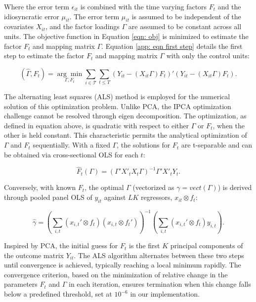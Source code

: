\documentclass[12pt]{article}
\begin{document}
\noindent Where the error term $\epsilon_{it}$ is combined with the time varying factors $F_t$ and the idiosyncratic error $\mu_{it}$. The error term $\mu_{it}$ is assumed to be independent of the covariates $X_{it}$, and the factor loadings $\Gamma$ are assumed to be constant across all units. The objective function in Equation \ref{eqn: obj} is minimized to estimate the factor $F_t$ and mapping matrix $\Gamma$. Equation \ref{app: eqn first step} details the first step to estimate the factor $F_t$ and mapping matrix $\Gamma$ with only the control units:

\begin{equation}
\label{app: eqn first step}
(\hat{\Gamma}, \hat{F}_t) = \underset{\Gamma, F_t}{\arg\min} \sum_{i \in \mathcal{T}} \sum_{t \leq T} \left( Y_{it} - (X_{it}\Gamma) F_{t} \right)' \left( Y_{it} - (X_{it}\Gamma) F_{t} \right).
\end{equation}

The alternating least squares (ALS) method is employed for the numerical solution of this optimization problem. Unlike PCA, the IPCA optimization challenge cannot be resolved through eigen decomposition. The optimization, as defined in equation above, is quadratic with respect to either $\Gamma$ or $F_t$, when the other is held constant. This characteristic permits the analytical optimization of $\Gamma$ and $F_t$ sequentially. With a fixed $\Gamma$, the solutions for $F_t$ are t-separable and can be obtained via cross-sectional OLS for each $t$:

\begin{equation}
\label{app: eqn update f}
\hat{F}_t(\Gamma) = (\Gamma' X'_t X_t \Gamma)^{-1} \Gamma' X'_t Y_t.
\end{equation}

Conversely, with known $F_{t}$, the optimal $\Gamma$ (vectorized as $\gamma = vect(\Gamma)$) is derived through pooled panel OLS of $y_{it}$ against $LK$ regressors, $x_{it} \otimes f_t$:

\begin{equation}
\label{app: eqn update gamma}
\hat{\gamma} = \left( \sum_{i,t} (x_{i,t}' \otimes f_t) (x_{i,t} \otimes f_t') \right)^{-1} \left( \sum_{i,t} (x_{i,t}' \otimes f_t) y_{i,t} \right).
\end{equation}

Inspired by PCA, the initial guess for $F_t$ is the first $K$ principal components of the outcome matrix $Y_{it}$. The ALS algorithm alternates between these two steps until convergence is achieved, typically reaching a local minimum rapidly. The convergence criterion, based on the minimization of relative change in the parameters $F_t$ and $\Gamma$ in each iteration, ensures termination when this change falls below a predefined threshold, set at $10^{-6}$ in our implementation.
\end{document}
